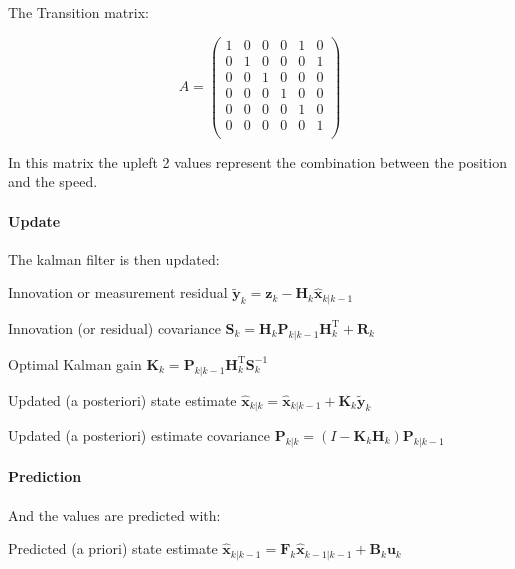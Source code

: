 The Transition matrix:

\[ A = \left(
\begin{array}{cccccc}
	1 & 0 & 0 & 0 & 1 & 0 \\
	0 & 1 & 0 & 0 & 0 & 1 \\
	0 & 0 & 1 & 0 & 0 & 0 \\
	0 & 0 & 0 & 1 & 0 & 0 \\
	0 & 0 & 0 & 0 & 1 & 0 \\
	0 & 0 & 0 & 0 & 0 & 1 \\
\end{array} \right)\] 

In this matrix  the upleft 2 values represent the combination between the position and the speed.




\paragraph{Update}
The kalman filter is then updated:

Innovation or measurement residual 	
$\tilde{\textbf{y}}_k = \textbf{z}_k - \textbf{H}_k\hat{\textbf{x}}_{k|k-1}$

Innovation (or residual) covariance
$\textbf{S}_k = \textbf{H}_k \textbf{P}_{k|k-1} \textbf{H}_k^\text{T} + \textbf{R}_k$

Optimal Kalman gain
$\textbf{K}_k = \textbf{P}_{k|k-1}\textbf{H}_k^\text{T}\textbf{S}_k^{-1}$

Updated (a posteriori) state estimate
$\hat{\textbf{x}}_{k|k} = \hat{\textbf{x}}_{k|k-1} + \textbf{K}_k\tilde{\textbf{y}}_k$

Updated (a posteriori) estimate covariance
$\textbf{P}_{k|k} = (I - \textbf{K}_k \textbf{H}_k) \textbf{P}_{k|k-1}$

\paragraph{Prediction}
And the values are predicted with:

Predicted (a priori) state estimate 	
$\hat{\textbf{x}}_{k|k-1} = \textbf{F}_{k}\hat{\textbf{x}}_{k-1|k-1} + \textbf{B}_{k} \textbf{u}_{k}$

